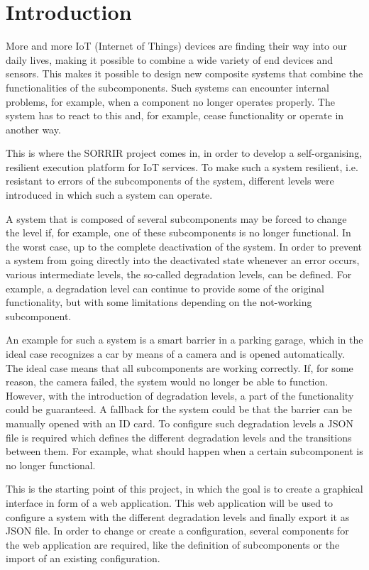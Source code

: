 \section{Introduction}
\label{sec:intro}

More and more IoT (Internet of Things) devices are finding their way into our daily lives, making it possible to combine a wide variety of end devices and sensors. This makes it possible to design new composite systems that combine the functionalities of the subcomponents. Such systems can encounter internal problems, for example, when a component no longer operates properly. The system has to react to this and, for example, cease functionality or operate in another way.

This is where the SORRIR project comes in, in order to develop a self-organising, resilient execution platform for IoT services. To make such a system resilient, i.e. resistant to errors of the subcomponents of the system, different levels were introduced in which such a system can operate. 

A system that is composed of several subcomponents may be forced to change the level if, for example, one of these subcomponents is no longer functional. In the worst case, up to the complete deactivation of the system. In order to prevent a system from going directly into the deactivated state whenever an error occurs, various intermediate levels, the so-called degradation levels, can be defined. For example, a degradation level can continue to provide some of the original functionality, but with some limitations depending on the not-working subcomponent.

An example for such a system is a smart barrier in a parking garage, which in the ideal case recognizes a car by means of a camera and is opened automatically. The ideal case means that all subcomponents are working correctly. If, for some reason, the camera failed, the system would no longer be able to function. However, with the introduction of degradation levels, a part of the functionality could be guaranteed. A fallback for the system could be that the barrier can be manually opened with an ID card. To configure such degradation levels a JSON file is required which defines the different degradation levels and the transitions between them. For example, what should happen when a certain subcomponent is no longer functional.

This is the starting point of this project, in which the goal is to create a graphical interface in form of a web application. This web application will be used to configure a system with the different degradation levels and finally export it as JSON file. In order to change or create a configuration, several components for the web application are required, like the definition of subcomponents or the import of an existing configuration. 

